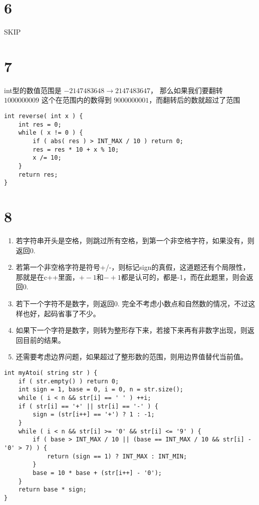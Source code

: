 \documentclass[12pt,a4paper]{article}
\begin{document}
\section{6}
SKIP

\section{7}
\begin{CJK}{UTF8}{gbsn}
int型的数值范围是 $-2147483648\to2147483647$， 那么如果我们要翻转 $1000000009$ 这个在范围内的数得到 $9000000001$，而翻转后的数就超过了范围
\end{CJK}
\begin{lstlisting}
int reverse( int x ) {
	int res = 0;
	while ( x != 0 ) {
		if ( abs( res ) > INT_MAX / 10 ) return 0;
		res = res * 10 + x % 10;
		x /= 10;
	}
	return res;
}
\end{lstlisting}

\section{8}
\begin{CJK}{UTF8}{gbsn}
\begin{enumerate}
\item 若字符串开头是空格，则跳过所有空格，到第一个非空格字符，如果没有，则返回0.
\item 若第一个非空格字符是符号+/-，则标记sign的真假，这道题还有个局限性，那就是在c++里面，$+-1$和$-+1$都是认可的，都是-1，而在此题里，则会返回0.
\item 若下一个字符不是数字，则返回0. 完全不考虑小数点和自然数的情况，不过这样也好，起码省事了不少。
\item 如果下一个字符是数字，则转为整形存下来，若接下来再有非数字出现，则返回目前的结果。
\item 还需要考虑边界问题，如果超过了整形数的范围，则用边界值替代当前值。
\end{enumerate}
\end{CJK}
\begin{lstlisting}
int myAtoi( string str ) {
	if ( str.empty() ) return 0;
	int sign = 1, base = 0, i = 0, n = str.size();
	while ( i < n && str[i] == ' ' ) ++i;
	if ( str[i] == '+' || str[i] == '-' ) {
		sign = (str[i++] == '+') ? 1 : -1;
	}
	while ( i < n && str[i] >= '0' && str[i] <= '9' ) {
		if ( base > INT_MAX / 10 || (base == INT_MAX / 10 && str[i] - '0' > 7) ) {
			return (sign == 1) ? INT_MAX : INT_MIN;
		}
		base = 10 * base + (str[i++] - '0');
	}
	return base * sign;
}
\end{lstlisting}
\end{document}

